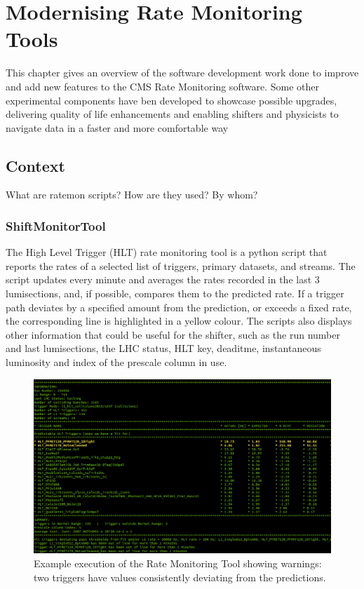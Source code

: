 \chapter{Modernising Rate Monitoring Tools}

This chapter gives an overview of the software development work done to improve and add new features to the CMS Rate Monitoring software. Some other experimental components have ben developed to showcase possible upgrades, delivering quality of life enhancements and enabling shifters and physicists to navigate data in a faster and more comfortable way \cite{VivaceRTM1}

\section{Context}

What are ratemon scripts? How are they used? By whom?

\subsection{ShiftMonitorTool}

The High Level Trigger (HLT) rate monitoring tool is a python script that reports the rates of a selected list of triggers, primary datasets, and streams. The script updates every minute and averages the rates recorded in the last 3 lumisections, and, if possible, compares them to the predicted rate. If a trigger path deviates by a specified amount from the prediction, or exceeds a fixed rate, the corresponding line is highlighted in a yellow colour. The scripts also displays other information that could be useful for the shifter, such as the run number and last lumisections, the LHC status, HLT key, deaditme, instantaneous luminosity and index of the prescale column in use.

\begin{figure}
	\centerline{
		\includegraphics[width=0.8\paperwidth]{figures/ratemon_warnings}}
	\caption{Example execution of the Rate Monitoring Tool showing warnings: two triggers have values consistently deviating from the predictions. \cite{ratemon-twiki}}
	\label{fig:ratemon_warnings}
\end{figure}

